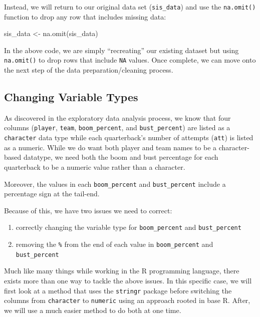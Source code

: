 \documentclass[
  letterpaper,
]{krantz}
\newenvironment{Shaded}{\begin{snugshade}}{\end{snugshade}}
\newcommand{\FunctionTok}[1]{\textcolor[rgb]{0.28,0.35,0.67}{#1}}
\newcommand{\NormalTok}[1]{\textcolor[rgb]{0.00,0.23,0.31}{#1}}
\newcommand{\OtherTok}[1]{\textcolor[rgb]{0.00,0.23,0.31}{#1}}
\providecommand{\tightlist}{%
  \setlength{\itemsep}{0pt}\setlength{\parskip}{0pt}}\usepackage{longtable,booktabs,array}
\begin{document}
Instead, we will return to our original data set (\texttt{sis\_data})
and use the \texttt{na.omit()} function to drop any row that includes
missing data:

\begin{Shaded}
\begin{Highlighting}[]
\NormalTok{sis\_data }\OtherTok{\textless{}{-}} \FunctionTok{na.omit}\NormalTok{(sis\_data)}
\end{Highlighting}
\end{Shaded}

In the above code, we are simply ``recreating'' our existing dataset but
using \texttt{na.omit()} to drop rows that include \texttt{NA} values.
Once complete, we can move onto the next step of the data
preparation/cleaning process.

\hypertarget{changing-variable-types}{%
\subsection{Changing Variable Types}\label{changing-variable-types}}

As discovered in the exploratory data analysis process, we know that
four columns (\texttt{player}, \texttt{team}, \texttt{boom\_percent},
and \texttt{bust\_percent}) are listed as a \texttt{character} data type
while each quarterback's number of attempts (\texttt{att}) is listed as
a numeric. While we do want both player and team names to be a
character-based datatype, we need both the boom and bust percentage for
each quarterback to be a numeric value rather than a character.

Moreover, the values in each \texttt{boom\_percent} and
\texttt{bust\_percent} include a percentage sign at the tail-end.

Because of this, we have two issues we need to correct:

\begin{enumerate}
\def\labelenumi{\arabic{enumi}.}
\tightlist
\item
  correctly changing the variable type for \texttt{boom\_percent} and
  \texttt{bust\_percent}
\item
  removing the \texttt{\%} from the end of each value in
  \texttt{boom\_percent} and \texttt{bust\_percent}
\end{enumerate}

Much like many things while working in the R programming language, there
exists more than one way to tackle the above issues. In this specific
case, we will first look at a method that uses the \texttt{stringr}
package before switching the columns from \texttt{character} to
\texttt{numeric} using an approach rooted in base R. After, we will use
a much easier method to do both at one time.
\end{document}
